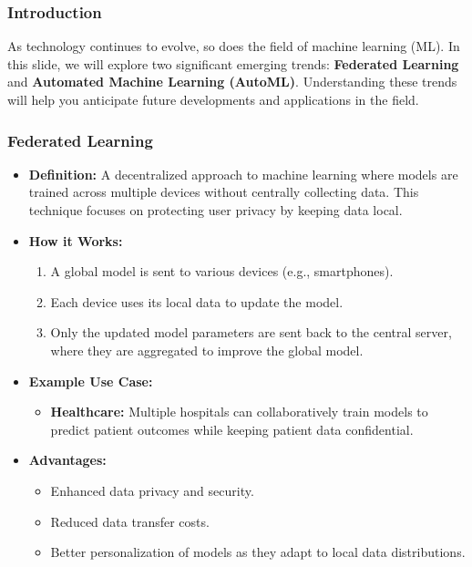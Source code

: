 \documentclass[aspectratio=169]{beamer}
\begin{document}
\begin{frame}[fragile]
    \frametitle{Introduction}
    As technology continues to evolve, so does the field of machine learning (ML). 
    In this slide, we will explore two significant emerging trends: 
    \textbf{Federated Learning} and \textbf{Automated Machine Learning (AutoML)}. 
    Understanding these trends will help you anticipate future developments and applications in the field.
\end{frame}

\begin{frame}[fragile]
    \frametitle{Federated Learning}
    \begin{itemize}
        \item \textbf{Definition:} A decentralized approach to machine learning where models are trained across multiple devices without centrally collecting data. This technique focuses on protecting user privacy by keeping data local.
        \item \textbf{How it Works:}
        \begin{enumerate}
            \item A global model is sent to various devices (e.g., smartphones).
            \item Each device uses its local data to update the model.
            \item Only the updated model parameters are sent back to the central server, where they are aggregated to improve the global model.
        \end{enumerate}
        \item \textbf{Example Use Case:} 
        \begin{itemize}
            \item \textbf{Healthcare:} Multiple hospitals can collaboratively train models to predict patient outcomes while keeping patient data confidential.
        \end{itemize}
        \item \textbf{Advantages:}
        \begin{itemize}
            \item Enhanced data privacy and security.
            \item Reduced data transfer costs.
            \item Better personalization of models as they adapt to local data distributions.
        \end{itemize}
    \end{itemize}
\end{frame}
\end{document}
